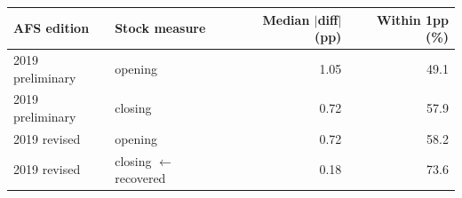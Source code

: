 \begin{tabular}{llrr}
\toprule
AFS edition & Stock measure & Median $|$diff$|$ (pp) & Within 1pp (\%) \\
\midrule
2019 preliminary & opening & 1.05 & 49.1 \\
2019 preliminary & closing & 0.72 & 57.9 \\
2019 revised & opening & 0.72 & 58.2 \\
2019 revised & closing $\leftarrow$ recovered & 0.18 & 73.6 \\
\bottomrule
\end{tabular}
